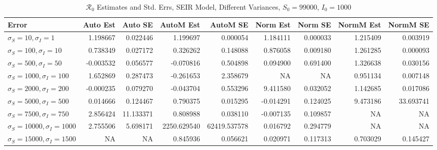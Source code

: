 \documentclass[12pt]{article}
\newcommand{\rr}{\ensuremath{\mathcal{R}_0}}
\begin{document}
\begin{table}[H]
	
	
	\caption{$\rr$ Estimates and Std. Errs, SEIR Model, 
		Different Variances, $S_0 = 99000$, $I_0 = 1000$}
	\begin{footnotesize}
		\hskip -1.7cm
	\begin{tabular}{l|r|r|r|r|r|r|r|r}
		\hline
		Error & Auto Est & Auto SE & AutoM Est & AutoM SE & Norm Est & Norm SE & NormM Est & NormM SE\\
		\hline
		$\sigma_S = 10, \sigma_I = 1$ & 1.198667 & 0.022446 & 1.199697 & 0.000054 & 1.184111 & 0.000033 & 1.215409 & 0.003919\\
		\hline
		$\sigma_S = 100, \sigma_I = 10$ & 0.738349 & 0.027172 & 0.326262 & 0.148088 & 0.876058 & 0.009180 & 1.261285 & 0.000093\\
		\hline
		$\sigma_S = 500, \sigma_I = 50$ & -0.003532 & 0.056577 & -0.070816 & 0.504898 & 0.094900 & 0.691400 & 1.326638 & 0.030156\\
		\hline
		$\sigma_S = 1000, \sigma_I = 100$ & 1.652869 & 0.287473 & -0.261653 & 2.358679 & NA & NA & 0.951134 & 0.007148\\
		\hline
		$\sigma_S = 2000, \sigma_I = 200$ & -0.000235 & 0.079270 & -0.043704 & 0.553296 & 9.411580 & 0.032052 & 1.142685 & 0.017086\\
		\hline
		$\sigma_S = 5000, \sigma_I = 500$ & 0.014666 & 0.124467 & 0.790375 & 0.015295 & -0.014291 & 0.124025 & 9.473186 & 33.693741\\
		\hline
		$\sigma_S = 7500, \sigma_I = 750$ & 2.856424 & 11.133371 & 0.808988 & 0.038110 & -0.007135 & 0.109857 & NA & NA\\
		\hline
		$\sigma_S = 10000, \sigma_I = 1000$ & 2.755506 & 5.698171 & 2250.629540 & 62419.537578 & 0.016792 & 0.294779 & NA & NA\\
		\hline
		$\sigma_S = 15000, \sigma_I = 1500$ & NA & NA & 0.845936 & 0.056621 & 0.020971 & 0.117313 & 0.703029 & 0.145427\\
		\hline
	\end{tabular}
\end{footnotesize}
\end{table}
\end{document}

